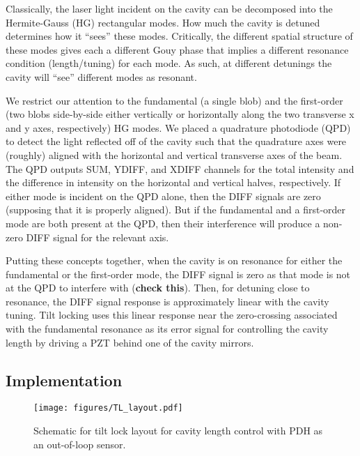 \documentclass[aps,pra,superscriptaddress,reprint,nofootinbib]{revtex4-1}
\begin{document}
Classically, the laser light incident on the cavity can be decomposed into the Hermite-Gauss (HG) rectangular modes. How much the cavity is detuned determines how it ``sees'' these modes. Critically, the different spatial structure of these modes gives each a different Gouy phase that implies a different resonance condition (length/tuning) for each mode. As such, at different detunings the cavity will ``see'' different modes as resonant.


We restrict our attention to the fundamental (a single blob) and the first-order (two blobs side-by-side either vertically or horizontally along the two transverse x and y axes, respectively) HG modes. We placed a quadrature photodiode (QPD) to detect the light reflected off of the cavity such that the quadrature axes were (roughly) aligned with the horizontal and vertical transverse axes of the beam. The QPD outputs SUM, YDIFF, and XDIFF channels for the total intensity and the difference in intensity on the horizontal and vertical halves, respectively. If either mode is incident on the QPD alone, then the DIFF signals are zero (supposing that it is properly aligned). But if the fundamental and a first-order mode are both present at the QPD, then their interference will produce a non-zero DIFF signal for the relevant axis.


Putting these concepts together, when the cavity is on resonance for either the fundamental or the first-order mode, the DIFF signal is zero as that mode is not at the QPD to interfere with (\textbf{check this}). Then, for detuning close to resonance, the DIFF signal response is approximately linear with the cavity tuning. Tilt locking uses this linear response near the zero-crossing associated with the fundamental resonance as its error signal for controlling the cavity length by driving a PZT behind one of the cavity mirrors.


\subsection{Implementation}




\begin{figure*}
	\texttt{[image: figures/TL\_layout.pdf]}
	\caption{Schematic for tilt lock layout for cavity length control with PDH as an out-of-loop sensor.}
\end{figure*}
\end{document}
